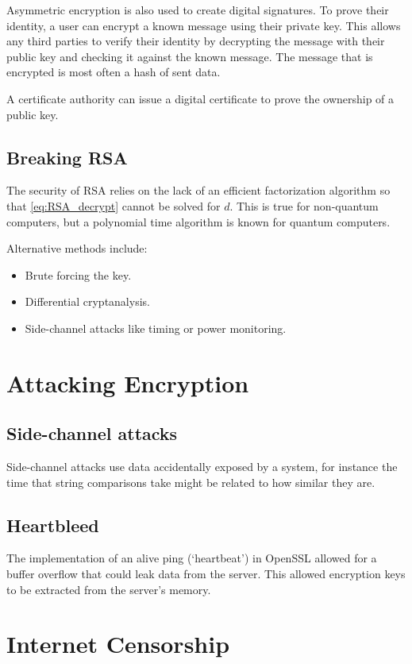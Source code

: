 Asymmetric encryption is also used to create digital signatures. To prove their identity, a user can encrypt a known message using their private key. This allows any third parties to verify their identity by decrypting the message with their public key and checking it against the known message. The message that is encrypted is most often a hash of sent data.

A certificate authority can issue a digital certificate to prove the ownership of a public key.

\subsection{Breaking RSA}
The security of RSA relies on the lack of an efficient factorization algorithm so that \cref{eq:RSA_decrypt} cannot be solved for \(d\). This is true for non-quantum computers, but a polynomial time algorithm is known for quantum computers.

Alternative methods include:
\begin{itemize}
    \item Brute forcing the key.
    \item Differential cryptanalysis.
    \item Side-channel attacks like timing or power monitoring.
\end{itemize}

\section{Attacking Encryption}
\subsection{Side-channel attacks}
Side-channel attacks use data accidentally exposed by a system, for instance the time that string comparisons take might be related to how similar they are.

\subsection{Heartbleed}
The implementation of an alive ping (`heartbeat') in OpenSSL allowed for a buffer overflow that could leak data from the server. This allowed encryption keys to be extracted from the server's memory.

\section{Internet Censorship}

